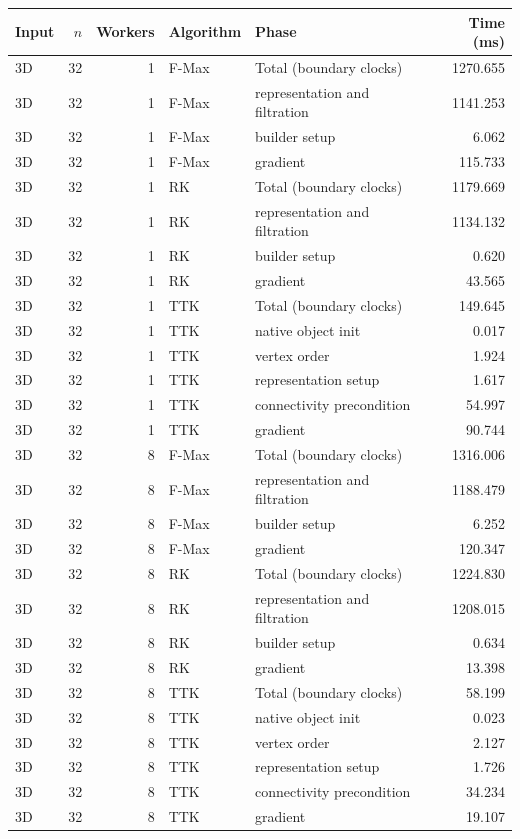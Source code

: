 \begin{tabular}{lrrllr}
\hline
Input & $n$ & Workers & Algorithm & Phase & Time (ms) \\
\hline
3D & 32 & 1 & F-Max & Total (boundary clocks) & 1270.655 \\
3D & 32 & 1 & F-Max & representation and filtration & 1141.253 \\
3D & 32 & 1 & F-Max & builder setup & 6.062 \\
3D & 32 & 1 & F-Max & gradient & 115.733 \\
3D & 32 & 1 & RK & Total (boundary clocks) & 1179.669 \\
3D & 32 & 1 & RK & representation and filtration & 1134.132 \\
3D & 32 & 1 & RK & builder setup & 0.620 \\
3D & 32 & 1 & RK & gradient & 43.565 \\
3D & 32 & 1 & TTK & Total (boundary clocks) & 149.645 \\
3D & 32 & 1 & TTK & native object init & 0.017 \\
3D & 32 & 1 & TTK & vertex order & 1.924 \\
3D & 32 & 1 & TTK & representation setup & 1.617 \\
3D & 32 & 1 & TTK & connectivity precondition & 54.997 \\
3D & 32 & 1 & TTK & gradient & 90.744 \\
3D & 32 & 8 & F-Max & Total (boundary clocks) & 1316.006 \\
3D & 32 & 8 & F-Max & representation and filtration & 1188.479 \\
3D & 32 & 8 & F-Max & builder setup & 6.252 \\
3D & 32 & 8 & F-Max & gradient & 120.347 \\
3D & 32 & 8 & RK & Total (boundary clocks) & 1224.830 \\
3D & 32 & 8 & RK & representation and filtration & 1208.015 \\
3D & 32 & 8 & RK & builder setup & 0.634 \\
3D & 32 & 8 & RK & gradient & 13.398 \\
3D & 32 & 8 & TTK & Total (boundary clocks) & 58.199 \\
3D & 32 & 8 & TTK & native object init & 0.023 \\
3D & 32 & 8 & TTK & vertex order & 2.127 \\
3D & 32 & 8 & TTK & representation setup & 1.726 \\
3D & 32 & 8 & TTK & connectivity precondition & 34.234 \\
3D & 32 & 8 & TTK & gradient & 19.107 \\
\hline
\end{tabular}
